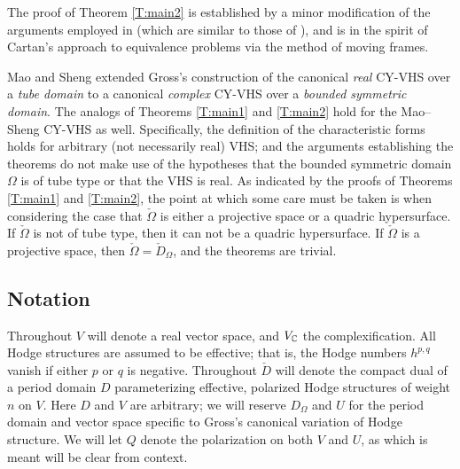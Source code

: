 \documentclass[12pt]{amsart}
\numberwithin{equation}{section}
\numberwithin{table}{section}
\numberwithin{figure}{section}
\begin{document}
The proof of Theorem \ref{T:main2} is established by a minor modification of the arguments employed in \cite{MR3004278} (which are similar to those of \cite{MR2030098}), and is in the spirit of Cartan's approach to equivalence problems via the method of moving frames.

\begin{remark}
Mao and Sheng \cite[\S2]{MR2657440} extended Gross's construction of the canonical \emph{real} CY-VHS over a \emph{tube domain} to a canonical \emph{complex} CY-VHS over a \emph{bounded symmetric domain}.  The analogs of Theorems \ref{T:main1} and \ref{T:main2} hold for the Mao--Sheng CY-VHS as well.  Specifically, the definition of the characteristic forms holds for arbitrary (not necessarily real) VHS; and the arguments establishing the theorems do not make use of the hypotheses that the bounded symmetric domain $\Omega$ is of tube type or that the VHS is real.  As indicated by the proofs of Theorems \ref{T:main1} and \ref{T:main2}, the point at which some care must be taken is when considering the case that $\check\Omega$ is either a projective space or a quadric hypersurface.  If $\check\Omega$ is not of tube type, then it can not be a quadric hypersurface.  If $\check\Omega$ is a projective space, then $\check\Omega = \check D_\Omega$, and the theorems are trivial. 
\end{remark}

\subsection{Notation} \label{S:prelim}

Throughout $V$ will denote a real vector space, and $V_\mathbb C$ the complexification.  All Hodge structures are assumed to be effective; that is, the Hodge numbers $h^{p,q}$ vanish if either $p$ or $q$ is negative.  Throughout $\check D$ will denote the compact dual of a period domain $D$ parameterizing effective, polarized Hodge structures of weight $n$ on $V$.  Here $D$ and $V$ are arbitrary; we will reserve $D_\Omega$ and $U$ for the period domain and vector space specific to Gross's canonical variation of Hodge structure.  We will let $Q$ denote the polarization on both $V$ and $U$, as which is meant will be clear from context.

\end{document}

